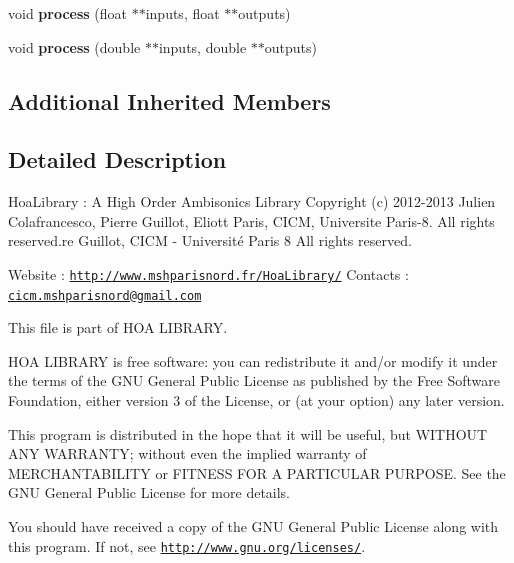 \begin{DoxyCompactItemize}
\item 
\hypertarget{class_ambisonics_filter_a9b73f86d05ba949a47faeddf89800e9c}{void {\bfseries process} (float $\ast$$\ast$inputs, float $\ast$$\ast$outputs)}\label{class_ambisonics_filter_a9b73f86d05ba949a47faeddf89800e9c}

\item 
\hypertarget{class_ambisonics_filter_a1a9abff888e189929ba9ea345adf66ba}{void {\bfseries process} (double $\ast$$\ast$inputs, double $\ast$$\ast$outputs)}\label{class_ambisonics_filter_a1a9abff888e189929ba9ea345adf66ba}

\end{DoxyCompactItemize}
\subsection*{Additional Inherited Members}


\subsection{Detailed Description}
Hoa\-Library \-: A High Order Ambisonics Library Copyright (c) 2012-\/2013 Julien Colafrancesco, Pierre Guillot, Eliott Paris, C\-I\-C\-M, Universite Paris-\/8. All rights reserved.\-re Guillot, C\-I\-C\-M -\/ Université Paris 8 All rights reserved.

Website \-: \href{http://www.mshparisnord.fr/HoaLibrary/}{\tt http\-://www.\-mshparisnord.\-fr/\-Hoa\-Library/} Contacts \-: \href{mailto:cicm.mshparisnord@gmail.com}{\tt cicm.\-mshparisnord@gmail.\-com}

This file is part of H\-O\-A L\-I\-B\-R\-A\-R\-Y.

H\-O\-A L\-I\-B\-R\-A\-R\-Y is free software\-: you can redistribute it and/or modify it under the terms of the G\-N\-U General Public License as published by the Free Software Foundation, either version 3 of the License, or (at your option) any later version.

This program is distributed in the hope that it will be useful, but W\-I\-T\-H\-O\-U\-T A\-N\-Y W\-A\-R\-R\-A\-N\-T\-Y; without even the implied warranty of M\-E\-R\-C\-H\-A\-N\-T\-A\-B\-I\-L\-I\-T\-Y or F\-I\-T\-N\-E\-S\-S F\-O\-R A P\-A\-R\-T\-I\-C\-U\-L\-A\-R P\-U\-R\-P\-O\-S\-E. See the G\-N\-U General Public License for more details.

You should have received a copy of the G\-N\-U General Public License along with this program. If not, see \href{http://www.gnu.org/licenses/}{\tt http\-://www.\-gnu.\-org/licenses/}. 

